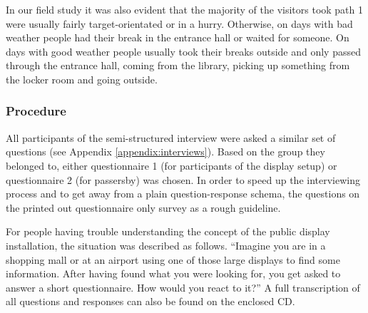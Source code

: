 	In our field study it was also evident that the majority of the visitors took path 1 were usually fairly target-orientated or in a hurry. Otherwise, on days with bad weather people had their break in the entrance hall or waited for someone. On days with good weather people usually took their breaks outside and only passed through the entrance hall, coming from the library, picking up something from the locker room and going outside.


	\subsubsection{Procedure}

		All participants of the semi-structured interview were asked a similar set of questions (see Appendix \ref{appendix:interviews}). Based on the group they belonged to, either questionnaire 1 (for participants of the display setup) or questionnaire 2 (for passersby) was chosen. In order to speed up the interviewing process and to get away from a plain question-response schema, the questions on the printed out questionnaire only survey as a rough guideline. 

		For people having trouble understanding the concept of the public display installation, the situation was described as follows. ``Imagine you are in a shopping mall or at an airport using one of those large displays to find some information. After having found what you were looking for, you get asked to answer a short questionnaire. How would you react to it?'' A full transcription of all questions and responses can also be found on the enclosed CD. 



